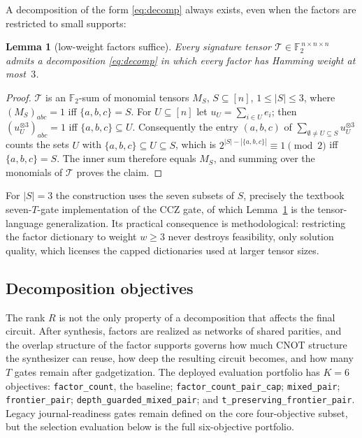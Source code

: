 \documentclass{cbctq}
\newtheorem{lemma}{Lemma}
\begin{document}
A decomposition of the form \eqref{eq:decomp} always exists, even when the factors are restricted to small supports:

\begin{lemma}[low-weight factors suffice]\label{lem:weight3}
Every signature tensor $\mathcal{T}\in\mathbb{F}_2^{\,n\times n\times n}$ admits a decomposition \eqref{eq:decomp} in which every factor has Hamming weight at most~$3$.
\end{lemma}

\begin{proof}
$\mathcal{T}$ is an $\mathbb{F}_2$-sum of monomial tensors $M_S$, $S\subseteq[n]$, $1\le|S|\le3$, where $(M_S)_{abc}=1$ iff $\{a,b,c\}=S$. For $U\subseteq[n]$ let $u_U=\sum_{i\in U}e_i$; then $(u_U^{\otimes3})_{abc}=1$ iff $\{a,b,c\}\subseteq U$. Consequently the entry $(a,b,c)$ of $\sum_{\emptyset\neq U\subseteq S}u_U^{\otimes3}$ counts the sets $U$ with $\{a,b,c\}\subseteq U\subseteq S$, which is $2^{|S|-|\{a,b,c\}|}\equiv 1 \pmod 2$ iff $\{a,b,c\}=S$. The inner sum therefore equals $M_S$, and summing over the monomials of $\mathcal{T}$ proves the claim.
\end{proof}

For $|S|=3$ the construction uses the seven subsets of $S$, precisely the textbook seven-$T$-gate implementation of the CCZ gate, of which Lemma~\ref{lem:weight3} is the tensor-language generalization. Its practical consequence is methodological: restricting the factor dictionary to weight $w\ge3$ never destroys feasibility, only solution quality, which licenses the capped dictionaries used at larger tensor sizes.

\subsection{Decomposition objectives}

The rank $R$ is not the only property of a decomposition that affects the final circuit. After synthesis, factors are realized as networks of shared parities, and the overlap structure of the factor supports governs how much CNOT structure the synthesizer can reuse, how deep the resulting circuit becomes, and how many $T$ gates remain after gadgetization. The deployed evaluation portfolio has $K=6$ objectives: \texttt{factor\_count}, the baseline; \texttt{factor\_count\_pair\_cap}; \texttt{mixed\_pair}; \texttt{frontier\_pair}; \texttt{depth\_guarded\_mixed\_pair}; and \texttt{t\_preserving\_frontier\_pair}. Legacy journal-readiness gates remain defined on the core four-objective subset, but the selection evaluation below is the full six-objective portfolio.
\end{document}
